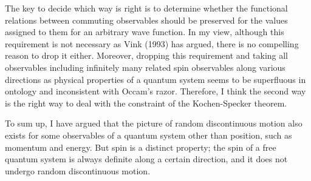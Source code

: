 The key to decide which way is right is to determine whether the functional relations between commuting observables should be preserved for the values assigned to them for an arbitrary wave function.
In my view, although this requirement is not necessary as Vink (1993) has argued, there is no compelling reason to drop it either.
Moreover, dropping this requirement and taking all observables including infinitely many related spin observables along various directions as physical properties of a quantum system seems to be superfluous in ontology and inconsistent with Occam's razor.
Therefore, I think the second way is the right way to deal with the constraint of the Kochen-Specker theorem.

To sum up, I have argued that the picture of random discontinuous motion also exists for some observables of a quantum system other than position, such as momentum and energy.
But spin is a distinct property; the spin of a free quantum system is always definite along a certain direction, and it does not undergo random discontinuous motion.




